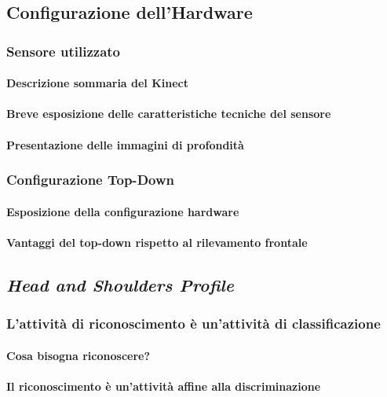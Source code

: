         \subsection{Configurazione dell'Hardware}
        \label{sub:hardware_configuration}
            \subsubsection{Sensore utilizzato}
                \paragraph{Descrizione sommaria del Kinect}
                \paragraph{Breve esposizione delle caratteristiche tecniche del sensore}
                \paragraph{Presentazione delle immagini di profondità}
            \subsubsection{Configurazione Top-Down}
                \paragraph{Esposizione della configurazione hardware}
                \paragraph{Vantaggi del top-down rispetto al rilevamento frontale}
        \subsection{\emph{Head and Shoulders Profile}}
        \label{sub:hasp}
            \subsubsection{L'attività di riconoscimento è un'attività di classificazione}
                \paragraph{Cosa bisogna riconoscere?}
                \paragraph{Il riconoscimento è un'attività affine alla discriminazione}
